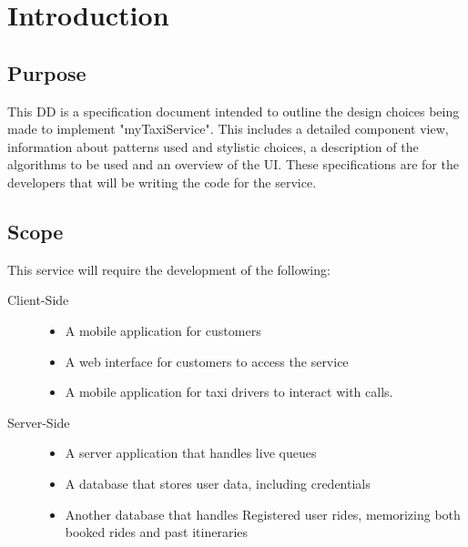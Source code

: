 \section{Introduction}

\subsection{Purpose}
	This DD is a specification document intended to outline the design choices being made to implement "myTaxiService". This includes a detailed component view, information about
	patterns used and stylistic choices, a description of the algorithms to be used and an overview of the UI. These specifications are for the developers that will be writing the code
	for the service.
\subsection{Scope}
	This service will require the development of the following:
	\begin{description}
		\item[Client-Side] \hfill
			\begin{itemize}
				\item A mobile application for customers
				\item A web interface for customers to access the service
				\item A mobile application for taxi drivers to interact with calls.
			\end{itemize}
		\item[Server-Side] \hfill
			\begin{itemize}
				\item A server application that handles live queues
				\item A database that stores user data, including credentials
				\item Another database that handles Registered user rides, memorizing both booked rides and past itineraries
			\end{itemize}
	\end{description}
	
